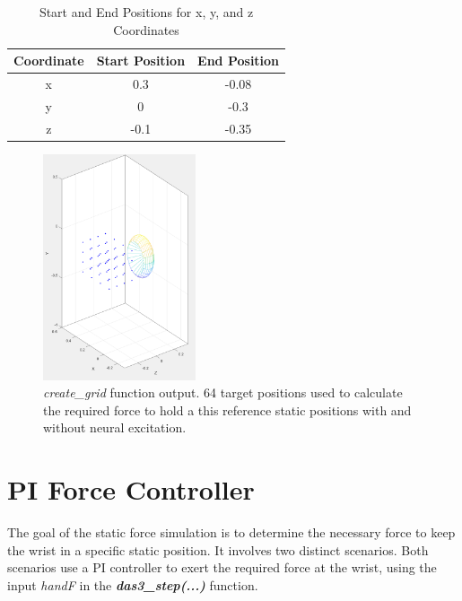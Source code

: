 \begin{table}[h]
    \centering
    \caption{Start and End Positions for x, y, and z Coordinates}

    \begin{tabular}{|c|c|c|}
        \hline
        Coordinate & Start Position & End Position \\
        \hline
        x & 0.3 & -0.08 \\
        y & 0 & -0.3 \\
        z & -0.1 & -0.35 \\
        \hline
    \end{tabular}
    \label{table:coordinates}
\end{table}

\begin{figure}[h!]
    \centering
    \includegraphics[width=0.4\textwidth]{Pictures/Model/create_grid.png}
    \caption{\textit{create\_grid} function output. 64 target positions used to calculate the required force to hold a this reference static positions with and without neural excitation.}
    \label{fig:create_grid}
\end{figure}

\newpage
\section{PI Force Controller}\label{sec:PI}

 The goal of the static force simulation is to determine the necessary force to keep the wrist in a specific static position. It involves two distinct scenarios. Both scenarios use a PI controller to exert the required force at the wrist, using the input \textit{handF} in the \textbf{\textit{das3\_step(...)}} function.


